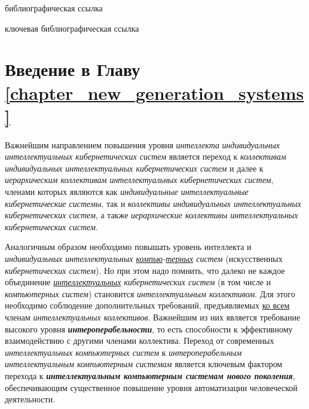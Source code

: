 \begin{SCn}
\bigskip

\begin{scnrelfromlist}{библиографическая ссылка}
\end{scnrelfromlist}

\bigskip

\begin{scnrelfromlist}{ключевая библиографическая ссылка}
	\scnitem{}
\end{scnrelfromlist}

\end{SCn}

\section*{Введение в Главу \ref{chapter_new_generation_systems}}

Важнейшим направлением повышения уровня \textit{интеллекта} \textit{индивидуальных интеллектуальных кибернетических систем} является переход к \textit{коллективам индивидуальных интеллектуальных кибернетических систем} и далее к \textit{иерархическим коллективам интеллектуальных кибернетических систем}, членами которых являются как \textit{индивидуальные интеллектуальные кибернетические системы}, так и \textit{коллективы индивидуальных интеллектуальных кибернетических систем}, а также \textit{иерархические коллективы интеллектуальных кибернетических систем}. 

Аналогичным образом необходимо повышать уровень интеллекта и \textit{индивидуальных интеллектуальных \underline{компью}-\underline{терных} систем} (искусственных \textit{кибернетических систем}). Но при этом надо помнить, что далеко не каждое объединение \textit{\underline{интеллектуальных} кибернетических систем} (в том числе и \textit{компьютерных систем}) становится \textit{интеллектуальным коллективом}. Для этого необходимо соблюдение дополнительных требований, предъявляемых \underline{ко всем} членам \textit{интеллектуальных коллективов}. Важнейшим из них является требование высокого уровня \textbf{\textit{интероперабельности}}, то есть способности к эффективному взаимодействию с другими членами коллектива. Переход от современных \textit{интеллектуальных компьютерных систем} к \textit{интероперабельным интеллектуальным компьютерным системам} является ключевым фактором перехода к \textbf{\textit{интеллектуальным компьютерным системам нового поколения}}, обеспечивающим существенное повышение уровня автоматизации человеческой деятельности.

